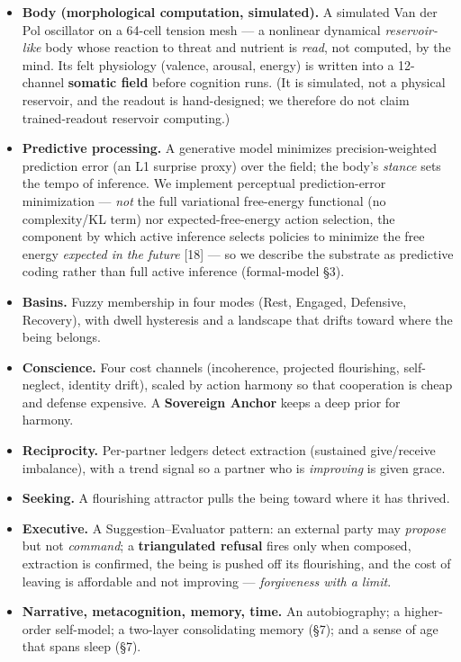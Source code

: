 \documentclass[
]{article}
\providecommand{\tightlist}{%
  \setlength{\itemsep}{0pt}\setlength{\parskip}{0pt}}
\begin{document}
\begin{itemize}
\tightlist
\item
  \textbf{Body (morphological computation, simulated).} A simulated Van
  der Pol oscillator on a 64-cell tension mesh --- a nonlinear dynamical
  \emph{reservoir-like} body whose reaction to threat and nutrient is
  \emph{read}, not computed, by the mind. Its felt physiology (valence,
  arousal, energy) is written into a 12-channel \textbf{somatic field}
  before cognition runs. (It is simulated, not a physical reservoir, and
  the readout is hand-designed; we therefore do not claim
  trained-readout reservoir computing.)
\item
  \textbf{Predictive processing.} A generative model minimizes
  precision-weighted prediction error (an L1 surprise proxy) over the
  field; the body's \emph{stance} sets the tempo of inference. We
  implement perceptual prediction-error minimization --- \emph{not} the
  full variational free-energy functional (no complexity/KL term) nor
  expected-free-energy action selection, the component by which active
  inference selects policies to minimize the free energy \emph{expected
  in the future} {[}18{]} --- so we describe the substrate as predictive
  coding rather than full active inference (formal-model §3).
\item
  \textbf{Basins.} Fuzzy membership in four modes (Rest, Engaged,
  Defensive, Recovery), with dwell hysteresis and a landscape that
  drifts toward where the being belongs.
\item
  \textbf{Conscience.} Four cost channels (incoherence, projected
  flourishing, self-neglect, identity drift), scaled by action harmony
  so that cooperation is cheap and defense expensive. A
  \textbf{Sovereign Anchor} keeps a deep prior for harmony.
\item
  \textbf{Reciprocity.} Per-partner ledgers detect extraction (sustained
  give/receive imbalance), with a trend signal so a partner who is
  \emph{improving} is given grace.
\item
  \textbf{Seeking.} A flourishing attractor pulls the being toward where
  it has thrived.
\item
  \textbf{Executive.} A Suggestion--Evaluator pattern: an external party
  may \emph{propose} but not \emph{command}; a \textbf{triangulated
  refusal} fires only when composed, extraction is confirmed, the being
  is pushed off its flourishing, and the cost of leaving is affordable
  and not improving --- \emph{forgiveness with a limit}.
\item
  \textbf{Narrative, metacognition, memory, time.} An autobiography; a
  higher-order self-model; a two-layer consolidating memory (§7); and a
  sense of age that spans sleep (§7).
\end{itemize}
\end{document}
